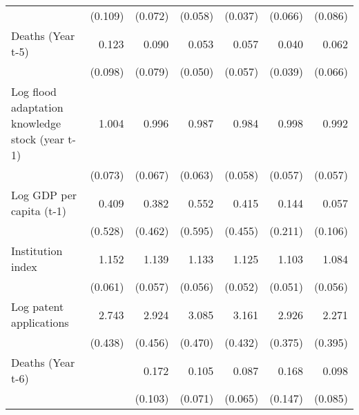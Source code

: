 \begin{table}[htbp]
\begin{tabular}{l*{6}{D{.}{.}{-1}}}
                    &     (0.109)         &     (0.072)         &     (0.058)         &     (0.037)         &     (0.066)         &     (0.086)         \\
\addlinespace
Deaths (Year t-5)   &       0.123\sym{***}&       0.090\sym{***}&       0.053\sym{***}&       0.057\sym{***}&       0.040\sym{***}&       0.062\sym{***}\\
                    &     (0.098)         &     (0.079)         &     (0.050)         &     (0.057)         &     (0.039)         &     (0.066)         \\
\addlinespace
Log flood adaptation knowledge stock (year t-1)&       1.004         &       0.996         &       0.987         &       0.984         &       0.998         &       0.992         \\
                    &     (0.073)         &     (0.067)         &     (0.063)         &     (0.058)         &     (0.057)         &     (0.057)         \\
\addlinespace
Log GDP per capita (t-1)&       0.409         &       0.382         &       0.552         &       0.415         &       0.144         &       0.057\sym{\%}  \\
                    &     (0.528)         &     (0.462)         &     (0.595)         &     (0.455)         &     (0.211)         &     (0.106)         \\
\addlinespace
Institution index   &       1.152\sym{***}&       1.139\sym{***}&       1.133\sym{**} &       1.125\sym{**} &       1.103\sym{**} &       1.084\sym{\%}  \\
                    &     (0.061)         &     (0.057)         &     (0.056)         &     (0.052)         &     (0.051)         &     (0.056)         \\
\addlinespace
Log patent applications&       2.743\sym{***}&       2.924\sym{***}&       3.085\sym{***}&       3.161\sym{***}&       2.926\sym{***}&       2.271\sym{***}\\
                    &     (0.438)         &     (0.456)         &     (0.470)         &     (0.432)         &     (0.375)         &     (0.395)         \\
\addlinespace
Deaths (Year t-6)   &                     &       0.172\sym{***}&       0.105\sym{***}&       0.087\sym{***}&       0.168\sym{**} &       0.098\sym{***}\\
                    &                     &     (0.103)         &     (0.071)         &     (0.065)         &     (0.147)         &     (0.085)         \\

\end{tabular}
\end{table}
